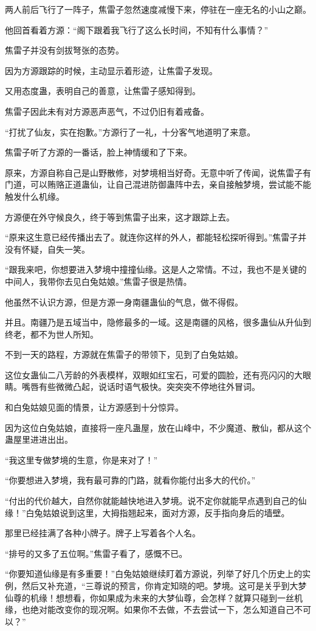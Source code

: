 \begin{this_body}
两人前后飞行了一阵子，焦雷子忽然速度减慢下来，停驻在一座无名的小山之巅。

他回首看着方源：“阁下跟着我飞行了这么长时间，不知有什么事情？”

焦雷子并没有剑拔弩张的态势。

因为方源跟踪的时候，主动显示着形迹，让焦雷子发现。

又用态度蛊，表明自己的善意，让焦雷子感知得到。

焦雷子因此未有对方源恶声恶气，不过仍旧有着戒备。

“打扰了仙友，实在抱歉。”方源行了一礼，十分客气地道明了来意。

焦雷子听了方源的一番话，脸上神情缓和了下来。

原来，方源自称自己是山野散修，对梦境相当好奇。无意中听了传闻，说焦雷子有门道，可以贿赂正道蛊仙，让自己混进防御蛊阵中去，亲自接触梦境，尝试能不能触发什么机缘。

方源便在外守候良久，终于等到焦雷子出来，这才跟踪上去。

“原来这生意已经传播出去了。就连你这样的外人，都能轻松探听得到。”焦雷子并没有怀疑，自失一笑。

“跟我来吧，你想要进入梦境中撞撞仙缘。这是人之常情。不过，我也不是关键的中间人，我带你去见白兔姑娘。”焦雷子很是热情。

他虽然不认识方源，但是方源一身南疆蛊仙的气息，做不得假。

并且。南疆乃是五域当中，隐修最多的一域。这是南疆的风格，很多蛊仙从升仙到终老，都不为世人所知。

不到一天的路程，方源就在焦雷子的带领下，见到了白兔姑娘。

这位女蛊仙二八芳龄的外表模样，双眼如红宝石，可爱的圆脸，还有亮闪闪的大眼睛。嘴唇有些微微凸起，说话时语气极快。突突突不停地往外冒词。

和白兔姑娘见面的情景，让方源感到十分惊异。

因为这位白兔姑娘，直接将一座凡蛊屋，放在山峰中，不少魔道、散仙，都从这个蛊屋里进进出出。

“我这里专做梦境的生意，你是来对了！”

“你要想进入梦境，我有最可靠的门路，就看你能付出多大的代价。”

“付出的代价越大，自然你就能越快地进入梦境。说不定你就能早点遇到自己的仙缘！”白兔姑娘说到这里，大拇指翘起来，面对方源，反手指向身后的墙壁。

那里已经挂满了各种小牌子。牌子上写着各个人名。

“排号的又多了五位啊。”焦雷子看了，感慨不已。

“你要知道仙缘是有多重要！”白兔姑娘继续盯着方源说，列举了好几个历史上的实例，然后又补充道，“三尊说的预言，你肯定知晓的吧。梦境。这可是关乎到大梦仙尊的机缘！想想看，你如果成为未来的大梦仙尊，会怎样？就算只碰到一丝机缘，也绝对能改变你的现况啊。如果你不去做，不去尝试一下，怎么知道自己不可以？”


\end{this_body}
